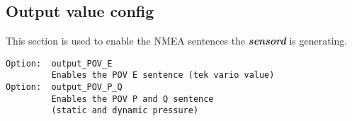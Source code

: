 \subsection{Output value config}
This section is used to enable the NMEA sentences the \textbf{\textit{sensord}} is generating.
\begin{lstlisting}
Option:  output_POV_E    
         Enables the POV E sentence (tek vario value)
Option:  output_POV_P_Q
         Enables the POV P and Q sentence 
         (static and dynamic pressure)
\end{lstlisting}